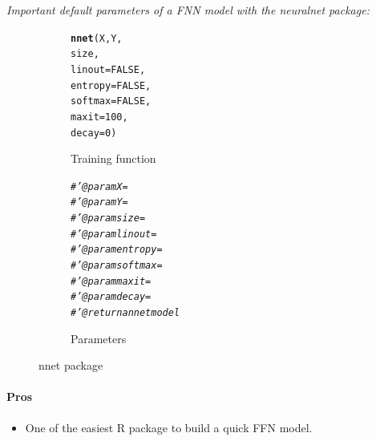 \documentclass[letter]{article}\usepackage[]{graphicx}\usepackage[]{color}
\makeatletter
\newcommand{\hlnum}[1]{\textcolor[rgb]{0.686,0.059,0.569}{#1}}%
\newcommand{\hlcom}[1]{\textcolor[rgb]{0.678,0.584,0.686}{\textit{#1}}}%
\newcommand{\hlstd}[1]{\textcolor[rgb]{0.345,0.345,0.345}{#1}}%
\newcommand{\hlkwc}[1]{\textcolor[rgb]{0.333,0.667,0.333}{#1}}%
\newcommand{\hlkwd}[1]{\textcolor[rgb]{0.737,0.353,0.396}{\textbf{#1}}}%
\newenvironment{kframe}{%
 \def\at@end@of@kframe{}%
 \ifinner\ifhmode%
  \def\at@end@of@kframe{\end{minipage}}%
  \begin{minipage}{\columnwidth}%
 \fi\fi%
 \def\FrameCommand##1{\hskip\@totalleftmargin \hskip-\fboxsep
 \colorbox{shadecolor}{##1}\hskip-\fboxsep
     \hskip-\linewidth \hskip-\@totalleftmargin \hskip\columnwidth}%
 \MakeFramed {\advance\hsize-\width
   \@totalleftmargin\z@ \linewidth\hsize
   \@setminipage}}%
 {\par\unskip\endMakeFramed%
 \at@end@of@kframe}
\newenvironment{knitrout}{}{} %
\makeatother
\begin{document}
\textit{Important default parameters of a FNN model with the neuralnet package:}
\begin{figure}[H]
  \begin{subfigure}{0.5\textwidth}
\begin{knitrout}
\color{fgcolor}\begin{kframe}
\begin{alltt}
\hlkwd{nnet}\hlstd{(X, Y,}
     \hlstd{size,}
     \hlkwc{linout}\hlstd{=}\hlnum{FALSE}\hlstd{,}
     \hlkwc{entropy}\hlstd{=}\hlnum{FALSE}\hlstd{,}
     \hlkwc{softmax}\hlstd{=}\hlnum{FALSE}\hlstd{,}
     \hlkwc{maxit} \hlstd{=} \hlnum{100}\hlstd{,}
     \hlkwc{decay} \hlstd{=} \hlnum{0}\hlstd{)}
\end{alltt}
\end{kframe}
\end{knitrout}
    \caption{Training function}
  \end{subfigure}
  \begin{subfigure}{0.5\textwidth}
    \centering
\begin{knitrout}
\color{fgcolor}\begin{kframe}
\begin{alltt}
  \hlcom{#' @param X = }
  \hlcom{#' @param Y = }
  \hlcom{#' @param size = }
  \hlcom{#' @param linout = }
  \hlcom{#' @param entropy = }
  \hlcom{#' @param softmax = }
  \hlcom{#' @param maxit = }
  \hlcom{#' @param decay = }
  \hlcom{#' @return a nnet model}
\end{alltt}
\end{kframe}
\end{knitrout}
    \caption{Parameters}
  \end{subfigure}
    \caption{nnet package}
\end{figure}


\paragraph{Pros}
\begin{itemize}
\item One of the easiest R package to build a quick FFN model.
\end{itemize}
\end{document}
